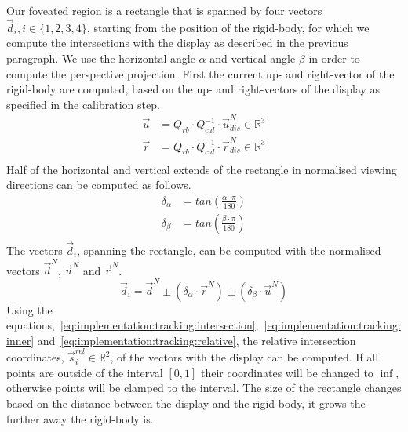 \documentclass[]{article}
\begin{document}
Our foveated region is a rectangle that is spanned by four vectors $\overrightarrow{d}_{i}, i \in \lbrace 1,2,3,4\rbrace$, starting from the position of the rigid-body, for which we compute the intersections with the display as described in the previous paragraph.
We use the horizontal angle $\alpha$ and vertical angle $\beta$ in order to compute the perspective projection.
First the current up- and right-vector of the rigid-body are computed, based on the up- and right-vectors of the display as specified in the calibration step.
%
\begin{equation*}
\begin{split}
\overrightarrow{u} &= Q_{rb} \cdot Q^{-1}_{cal} \cdot \overrightarrow{u}_{dis}^{N} \in \mathbb{R}^{3}\\
\overrightarrow{r} &= Q_{rb} \cdot Q^{-1}_{cal} \cdot \overrightarrow{r}_{dis}^{N} \in \mathbb{R}^{3}\\
\end{split}         
\end{equation*}
%
Half of the horizontal and vertical extends of the rectangle in normalised viewing directions can be computed as follows.
%
\begin{equation*}
\begin{split}
\delta_{\alpha} &= tan(\frac{\alpha \cdot \pi}{180})\\
\delta_{\beta}  &= tan(\frac{\beta \cdot \pi}{180})\\
\end{split}         
\end{equation*}
%
The vectors $\overrightarrow{d}_{i}$, spanning the rectangle, can be computed with the normalised vectors $\overrightarrow{d}^{N}$, $\overrightarrow{u}^{N}$ and $\overrightarrow{r}^{N}$.
%
\begin{equation}
\overrightarrow{d}_{i} = \overrightarrow{d}^{N} \pm(\delta_{\alpha} \cdot \overrightarrow{r}^{N}) \pm (\delta_{\beta} \cdot \overrightarrow{u}^{N})
\end{equation}
%
Using the equations,~\ref{eq:implementation:tracking:intersection},~\ref{eq:implementation:tracking:inner} and~\ref{eq:implementation:tracking:relative}, the relative intersection coordinates, $\overrightarrow{s}_{i}^{rel} \in \mathbb{R}^2$, of the vectors with the display can be computed.
If all points are outside of the interval $[0,1]$ their coordinates will be changed to $\inf$, otherwise points will be clamped to the interval.
The size of the rectangle changes based on the distance between the display and the rigid-body, it grows the further away the rigid-body is.

\end{document}
